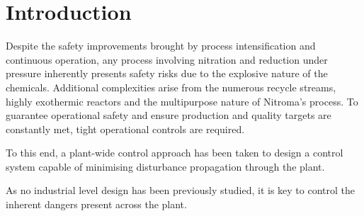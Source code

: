 \section{Introduction}%

Despite the safety improvements brought by process intensification and continuous operation, any process involving nitration and reduction under pressure inherently presents safety risks due to the explosive nature of the chemicals. Additional complexities arise from the numerous recycle streams, highly exothermic reactors and the multipurpose nature of Nitroma's process. To guarantee operational safety and ensure production and quality targets are constantly met, tight operational controls are required.  

To this end, a plant-wide control approach has been taken to design a control system capable of minimising disturbance propagation through the plant.

As no industrial level design has been previously studied, it is key to control the inherent dangers present across the plant.

